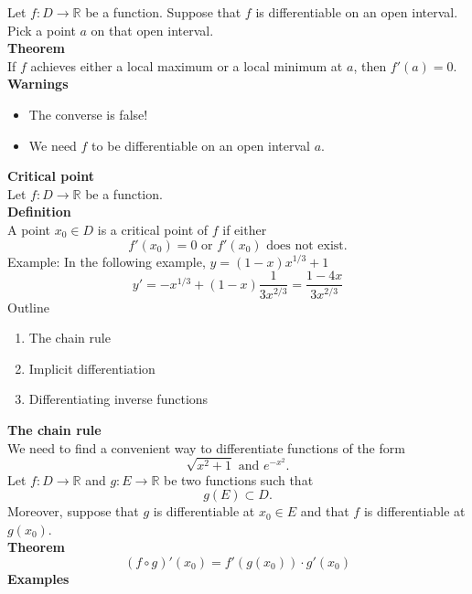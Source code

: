 \documentclass[]{article}
\begin{document}
	Let $f:D\rightarrow\mathbb{R}$ be a function. Suppose that $f$ is differentiable on an open interval. Pick a point $a$ on that open interval.\\
	{\bf Theorem}\\
	If $f$ achieves either a local maximum or a local minimum at $a$, then $f'(a)=0$.\\
	{\bf Warnings}
	\begin{itemize}
		\item The converse is false!
		\item We need $f$ to be differentiable on an open interval $a$.
	\end{itemize}
	{\bf Critical point}\\
	Let $f:D\rightarrow\mathbb{R}$ be a function.\\
	{\bf Definition}\\
	A point $x_0\in D$ is a critical point of $f$ if either
	$$
		f'(x_0)=0\text{ or }f'(x_0)\text{ does not exist}.
	$$
	Example: In the following example, $y=(1-x)x^{1/3}+1$
	$$
		y'=-x^{1/3}+(1-x)\frac{1}{3x^{2/3}}=\frac{1-4x}{3x^{2/3}}
	$$
	\large{Outline}
	\normalsize
	\begin{enumerate}
		\item The chain rule
		\item Implicit differentiation
		\item Differentiating inverse functions
	\end{enumerate}
	\large{\bf The chain rule}\\
	\normalsize
	We need to find a convenient way to differentiate functions of the form
	$$
		\sqrt{x^2+1}\text{ and }e^{-x^2}.
	$$
	Let $f:D\rightarrow\mathbb{R}$ and $g:E\rightarrow\mathbb{R}$ be two functions such that
	$$
		g(E)\subset D.
	$$
	Moreover, suppose that $g$ is differentiable at $x_0\in E$ and that $f$ is differentiable at $g(x_0)$.\\
	{\bf Theorem}
	$$
		(f\circ g)'(x_0)=f'(g(x_0))\cdot g'(x_0)
	$$
	{\bf Examples}
\end{document}
